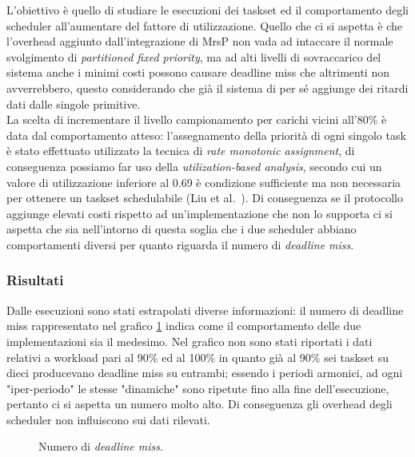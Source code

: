 \noindent L'obiettivo è quello di studiare le esecuzioni dei taskset ed il comportamento degli scheduler all'aumentare del fattore di utilizzazione. Quello che ci si aspetta è che l'overhead aggiunto dall'integrazione di MrsP non vada ad intaccare il normale svolgimento di \textit{partitioned fixed priority}, ma ad alti livelli di sovraccarico del sistema anche i minimi costi possono causare deadline miss che altrimenti non avverrebbero, questo considerando che già il sistema di per sé aggiunge dei ritardi dati dalle singole primitive.\\

\noindent La scelta di incrementare il livello campionamento per carichi vicini all'80\% è data dal comportamento atteso: l'assegnamento della priorità di ogni singolo task è stato effettuato utilizzato la tecnica di \textit{rate monotonic assignment}, di conseguenza possiamo far uso della \textit{utilization-based analysis}, secondo cui un valore di utilizzazione inferiore al 0.69 è condizione sufficiente ma non necessaria per ottenere un taskset schedulabile (Liu et al.~\cite{Liu:1973:SAM:321738.321743}). Di conseguenza se il protocollo aggiunge elevati costi rispetto ad un'implementazione che non lo supporta ci si aspetta che sia nell'intorno di questa soglia che i due scheduler abbiano comportamenti diversi per quanto riguarda il numero di \textit{deadline miss}.\\

\subsubsection{Risultati}
\label{sec:confronto_norisorsa_ris}

\noindent Dalle esecuzioni sono stati estrapolati diverse informazioni: il numero di deadline miss rappresentato nel grafico \ref{fig:DLM} indica come il comportamento delle due implementazioni sia il medesimo. Nel grafico non sono stati riportati i dati relativi a workload pari al 90\% ed al 100\% in quanto già al 90\% sei taskset su dieci producevano deadline miss su entrambi; essendo i periodi armonici, ad ogni "iper-periodo" le stesse "dinamiche" sono ripetute fino alla fine dell'esecuzione, pertanto ci si aspetta un numero molto alto. Di conseguenza gli overhead degli scheduler non influiscono sui dati rilevati.\\

  \begin{figure}
    \graficoUno
    \caption{Numero di \textit{deadline miss}.} %
    \label{fig:DLM}
  \end{figure}

